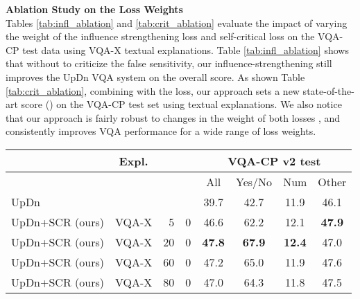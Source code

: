 \documentclass{article}
\begin{document}
\noindent\textbf{Ablation Study on the Loss Weights}\\
Tables \ref{tab:infl_ablation} and \ref{tab:crit_ablation} evaluate the impact of varying the weight of the influence strengthening loss and self-critical loss on the VQA-CP test data using VQA-X textual explanations. Table \ref{tab:infl_ablation} shows that without  to criticize the false sensitivity, our influence-strengthening still improves the UpDn VQA system  on the overall score. As shown Table \ref{tab:crit_ablation}, combining with the  loss, our approach sets a new state-of-the-art score () on the VQA-CP test set using textual explanations. We also notice that our approach is fairly robust to changes in the weight of both losses ,  and consistently improves VQA performance for a wide range of loss weights.

\begin{table*}[!t]
\centering
\begin{tabular}{l|c|rr|cccc}
\hline \toprule
                    & Expl. &  &  & \multicolumn{4}{c}{VQA-CP v2 test}\\    \hline
                    &       &    &    & All     & Yes/No &  Num  & Other \\ \hline\hline
UpDn    \cite{anderson2017bottom}            &       &     &  & 39.7   &  42.7  & 11.9  & 46.1  \\ \hline
UpDn+SCR (ours)   &  VQA-X  & 5     & 0& 46.6   &  62.2  & 12.1  & \textbf{47.9}  \\
UpDn+SCR (ours)   &  VQA-X  & 20  & 0& \textbf{47.8}   &  \textbf{67.9}  & \textbf{12.4}  & 47.0  \\
UpDn+SCR (ours)   &  VQA-X  & 60 & 0& 47.2   &  65.0  & 11.9  & 47.6  \\
UpDn+SCR (ours)   &  VQA-X  & 80 & 0& 47.0   &  64.3  & 11.8  & 47.5  \\ \bottomrule
\end{tabular}
\caption{Ablation study on various influence-strengthening loss weights on VQA-CP test data (.  The ``Expl.'' column shows the source of explanations for training the VQA systems. The ``'' column shows the influence-strengthening loss weight. The ``'' column shows the self-critical loss weight. SCR is the short hand for our self-critical reasoning approach.}
\label{tab:infl_ablation}
\end{table*}
\end{document}
